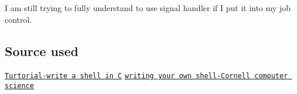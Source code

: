 I am still trying to fully understand to use signal handler if I put it into my job control.

\subsection*{Source used}

\href{http://brennan.io/2015/01/16/write-a-shell-in-c}{\tt Turtorial-\/write a shell in C} \href{https://www.cs.cornell.edu/courses/cs414/2004su/homework/shell/shel.html}{\tt writing your own shell-\/\+Cornell computer science} 